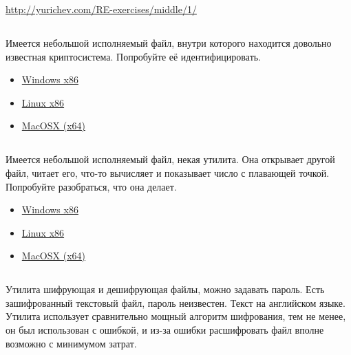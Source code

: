 \url{http://yurichev.com/RE-exercises/middle/1/}



\subsection{}

Имеется небольшой исполняемый файл, внутри которого находится довольно известная криптосистема.
Попробуйте её идентифицировать.

\begin{itemize}
\item
\href{http://yurichev.com/RE-exercises/middle/2/unknown_cryptosystem.exe}{Windows x86}

\item
\href{http://yurichev.com/RE-exercises/middle/2/unknown_encryption_linux86.tar}{Linux x86}

\item
\href{http://yurichev.com/RE-exercises/middle/2/unknown_encryption_MacOSX.tar}{MacOSX (x64)}
\end{itemize}

\subsection{}

Имеется небольшой исполняемый файл, некая утилита.
Она открывает другой файл, читает его, что-то вычисляет и показывает число с плавающей точкой.
Попробуйте разобраться, что она делает.

\begin{itemize}
\item
\href{http://yurichev.com/RE-exercises/middle/3/unknown_utility_2_3.exe}{Windows x86}

\item
\href{http://yurichev.com/RE-exercises/middle/3/unknown_utility_2_3_Linux86.tar}{Linux x86}

\item
\href{http://yurichev.com/RE-exercises/middle/3/unknown_utility_2_3_MacOSX.tar}{MacOSX (x64)}
\end{itemize}

\subsection{}

Утилита шифрующая и дешифрующая файлы, можно задавать пароль. Есть зашифрованный текстовый файл, пароль неизвестен.
Текст на английском языке.
Утилита использует сравнительно мощный алгоритм шифрования, тем не менее, он был использован с ошибкой,
и из-за ошибки расшифровать файл вполне возможно с минимумом затрат.

